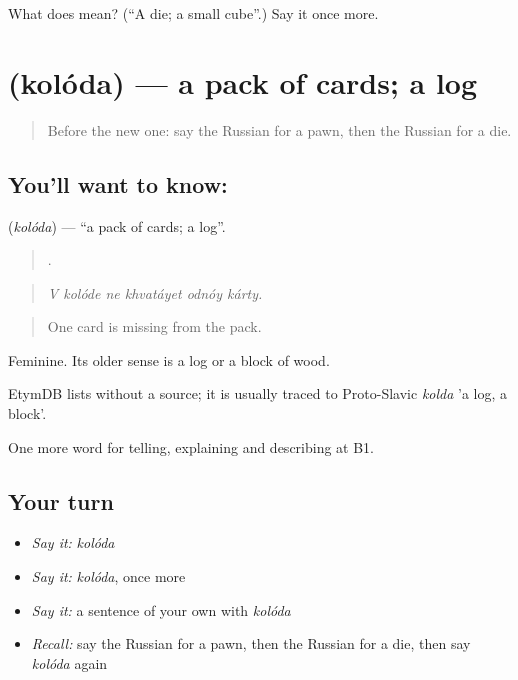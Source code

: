 \begin{tcolorbox}[breakable,colback=teal!4,colframe=teal!35!black,title={Before you move on}]
What does  mean? (\textquotedblleft{}A die; a small cube\textquotedblright{}.) Say it once more.
\end{tcolorbox}
\section[\texorpdfstring{\ru{колода} (kolóda)}{колода (kolóda)}]{ (kolóda) — a pack of cards; a log}

\label{lesson:RU-C504-koloda}



\begin{quote}
Before the new one: say the Russian for a pawn, then the Russian for a die.
\end{quote}

\subsection*{You'll want to know: }
\textbf{} (\emph{kolóda}) — \textquotedblleft{}a pack of cards; a log\textquotedblright{}.

\begin{quote}
     .
\end{quote}

\begin{quote}
\emph{V kolóde ne khvatáyet odnóy kárty.}
\end{quote}

\begin{quote}
One card is missing from the pack.
\end{quote}

Feminine. Its older sense is a log or a block of wood.

\begin{cousinweb}
EtymDB lists \emph{} without a source; it is usually traced to Proto-Slavic \emph{kolda} 'a log, a block'.
\end{cousinweb}

\begin{grammarlens}[title={What you've built}]
One more word for telling, explaining and describing at B1.
\end{grammarlens}

\subsection*{Your turn}
\begin{itemize}
\raggedright
  \item \emph{Say it:} \emph{kolóda}
  \item \emph{Say it:} \emph{kolóda}, once more
  \item \emph{Say it:} a sentence of your own with \emph{kolóda}
  \item \emph{Recall:} say the Russian for a pawn, then the Russian for a die, then say \emph{kolóda} again
\end{itemize}

